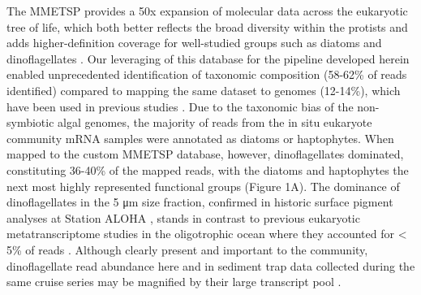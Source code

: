 The MMETSP provides a 50x expansion of molecular data across the eukaryotic tree of life, which both better reflects the broad diversity within the protists and adds higher-definition coverage for well-studied groups such as diatoms and dinoflagellates \citep{Keeling2014}. Our leveraging of this database for the pipeline developed herein enabled unprecedented identification of taxonomic composition (58-62\% of reads identified) compared to mapping the same dataset to genomes (12-14\%), which have been used in previous studies \citep{Marchetti2012}. Due to the taxonomic bias of the non-symbiotic algal genomes, the majority of reads from the in situ eukaryote community mRNA samples were annotated as diatoms or haptophytes. When mapped to the custom MMETSP database, however, dinoflagellates dominated, constituting 36-40\% of the mapped reads, with the diatoms and haptophytes the next most highly represented functional groups (Figure 1A). The dominance of dinoflagellates in the 5 μm size fraction, confirmed in historic surface pigment analyses at Station ALOHA \citep{Letelier1993}, stands in contrast to previous eukaryotic metatranscriptome studies in the oligotrophic ocean where they accounted for < 5\% of reads \citep{Marchetti2012a}. Although clearly present and important to the community, dinoflagellate read abundance here and in sediment trap data collected during the same cruise series \citep{Fontanez2015} may be magnified by their large transcript pool \citep{Moustafa2010, Hackett2004}. \par
